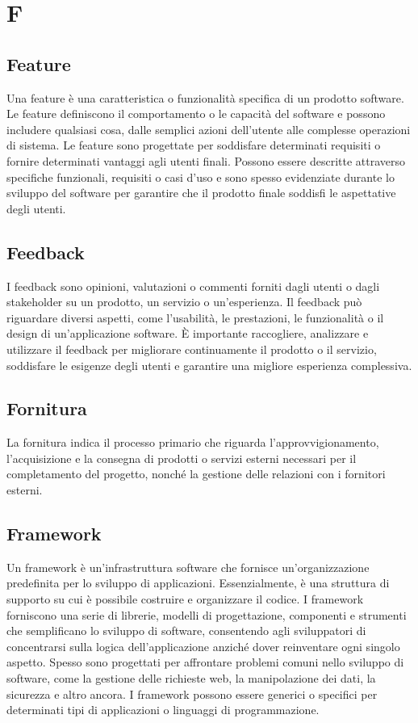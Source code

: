 \section*{F} 
\subsection*{Feature} 
Una feature è una caratteristica o funzionalità specifica di un prodotto software. Le feature definiscono il comportamento o le capacità del software e possono includere qualsiasi cosa, dalle semplici azioni dell'utente alle complesse operazioni di sistema. Le feature sono progettate per soddisfare determinati requisiti o fornire determinati vantaggi agli utenti finali. Possono essere descritte attraverso specifiche funzionali, requisiti o casi d'uso e sono spesso evidenziate durante lo sviluppo del software per garantire che il prodotto finale soddisfi le aspettative degli utenti.
\subsection*{Feedback} 
I feedback sono opinioni, valutazioni o commenti forniti dagli utenti o dagli stakeholder su un prodotto, un servizio o un'esperienza. Il feedback può riguardare diversi aspetti, come l'usabilità, le prestazioni, le funzionalità o il design di un'applicazione software. È importante raccogliere, analizzare e utilizzare il feedback per migliorare continuamente il prodotto o il servizio, soddisfare le esigenze degli utenti e garantire una migliore esperienza complessiva.
\subsection*{Fornitura} 
La fornitura indica il processo primario che riguarda l'approvvigionamento, l'acquisizione e la consegna di prodotti o servizi esterni necessari per il completamento del progetto, nonché la gestione delle relazioni con i fornitori esterni.
\subsection*{Framework} 
Un framework è un'infrastruttura software che fornisce un'organizzazione predefinita per lo sviluppo di applicazioni. Essenzialmente, è una struttura di supporto su cui è possibile costruire e organizzare il codice. I framework forniscono una serie di librerie, modelli di progettazione, componenti e strumenti che semplificano lo sviluppo di software, consentendo agli sviluppatori di concentrarsi sulla logica dell'applicazione anziché dover reinventare ogni singolo aspetto. Spesso sono progettati per affrontare problemi comuni nello sviluppo di software, come la gestione delle richieste web, la manipolazione dei dati, la sicurezza e altro ancora. I framework possono essere generici o specifici per determinati tipi di applicazioni o linguaggi di programmazione.
